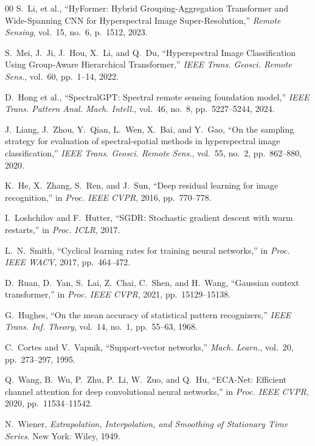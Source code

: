 \documentclass[conference]{IEEEtran}
\begin{document}
\begin{thebibliography}{00}
S.~Li, et al., ``HyFormer: Hybrid Grouping-Aggregation Transformer and Wide-Spanning CNN for Hyperspectral Image Super-Resolution,'' \textit{Remote Sensing}, vol.~15, no.~6, p.~1512, 2023.

S.~Mei, J.~Ji, J.~Hou, X.~Li, and Q.~Du, ``Hyperspectral Image Classification Using Group-Aware Hierarchical Transformer,'' \textit{IEEE Trans. Geosci. Remote Sens.}, vol.~60, pp.~1--14, 2022.

D.~Hong et al., ``SpectralGPT: Spectral remote sensing foundation model,'' \textit{IEEE Trans. Pattern Anal. Mach. Intell.}, vol.~46, no.~8, pp.~5227--5244, 2024.

J.~Liang, J.~Zhou, Y.~Qian, L.~Wen, X.~Bai, and Y.~Gao, ``On the sampling strategy for evaluation of spectral-spatial methods in hyperspectral image classification,'' \textit{IEEE Trans. Geosci. Remote Sens.}, vol.~55, no.~2, pp.~862--880, 2020.

K.~He, X.~Zhang, S.~Ren, and J.~Sun, ``Deep residual learning for image recognition,'' in \textit{Proc. IEEE CVPR}, 2016, pp.~770--778.

I.~Loshchilov and F.~Hutter, ``SGDR: Stochastic gradient descent with warm restarts,'' in \textit{Proc. ICLR}, 2017.

L.~N.~Smith, ``Cyclical learning rates for training neural networks,'' in \textit{Proc. IEEE WACV}, 2017, pp.~464--472.

D.~Ruan, D.~Yan, S.~Lai, Z.~Chai, C.~Shen, and H.~Wang, ``Gaussian context transformer,'' in \textit{Proc. IEEE CVPR}, 2021, pp.~15129--15138.

G.~Hughes, ``On the mean accuracy of statistical pattern recognizers,'' \textit{IEEE Trans. Inf. Theory}, vol.~14, no.~1, pp.~55--63, 1968.

C.~Cortes and V.~Vapnik, ``Support-vector networks,'' \textit{Mach. Learn.}, vol.~20, pp.~273--297, 1995.

Q.~Wang, B.~Wu, P.~Zhu, P.~Li, W.~Zuo, and Q.~Hu, ``ECA-Net: Efficient channel attention for deep convolutional neural networks,'' in \textit{Proc. IEEE CVPR}, 2020, pp.~11534--11542.

N.~Wiener, \textit{Extrapolation, Interpolation, and Smoothing of Stationary Time Series}. New York: Wiley, 1949.


\end{thebibliography}
\end{document}
